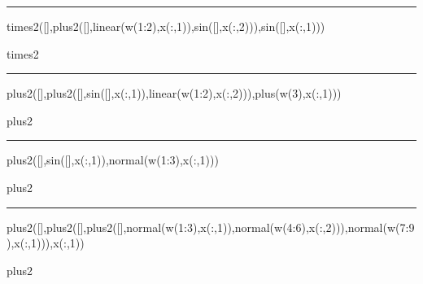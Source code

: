 \documentclass[12pt]{article}
\begin{document}
\hrule

times2([],plus2([],linear(w(1:2),x(:,1)),sin([],x(:,2))),sin([],x(:,1)))

\begin{bundle}{times2}\end{bundle}

\hrule

plus2([],plus2([],sin([],x(:,1)),linear(w(1:2),x(:,2))),plus(w(3),x(:,1)))

\begin{bundle}{plus2}\end{bundle}

\hrule

plus2([],sin([],x(:,1)),normal(w(1:3),x(:,1)))

\begin{bundle}{plus2}\end{bundle}

\hrule

plus2([],plus2([],plus2([],normal(w(1:3),x(:,1)),normal(w(4:6),x(:,2))),normal(w(7:9),x(:,1))),x(:,1))

\begin{bundle}{plus2}\end{bundle}
\end{document}

